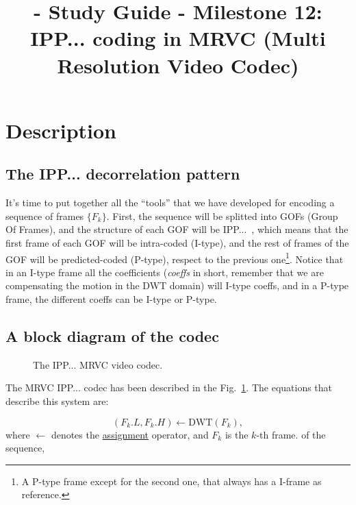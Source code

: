 
\title{\SM{} - Study Guide - Milestone 12: IPP... coding in MRVC (Multi Resolution Video Codec)}

\maketitle

\tableofcontents

\section{Description}

\subsection{The IPP... decorrelation pattern}
It's time to put together all the ``tools'' that we have developed for
encoding a sequence of frames $\{F_k\}$. First, the sequence will be
splitted into GOFs (Group Of Frames), and the structure of each GOF
will be IPP...~\cite{le1991mpeg}, which means that the first frame of
each GOF will be intra-coded (I-type), and the rest of frames of the
GOF will be predicted-coded (P-type), respect to the previous
one\footnote{A P-type frame except for the second one, that always has
  a I-frame as reference.}. Notice that in an I-type frame all the
coefficients (\emph{coeffs} in short, remember that we are
compensating the motion in the DWT domain) will I-type coeffs, and in
a P-type frame, the different coeffs can be I-type or P-type.

\subsection{A block diagram of the codec}

\begin{figure}
  \centering
  \caption{The IPP... MRVC video codec.}
  \label{fig:codec}
\end{figure}

The MRVC IPP... codec has been described in the
Fig.~\ref{fig:codec}. The equations that describe this system are:

\begin{equation}
  (F_k.L, F_k.H) \leftarrow \text{DWT}(F_k),
  \tag{a}
\end{equation}
where $\leftarrow$ denotes the
\href{https://en.wikipedia.org/wiki/Assignment_(computer_science)}{assignment}
operator, and $F_k$ is the $k$-th frame. of the sequence,

